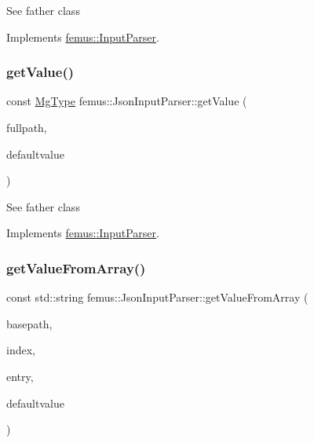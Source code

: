 See father class 

Implements \mbox{\hyperlink{classfemus_1_1_input_parser_afed8cdbe224355e291485f85dcf3a051}{femus\+::\+Input\+Parser}}.

\mbox{\label{classfemus_1_1_json_input_parser_a6851a934e4f6fa21195bbaef6f3999d9}} 
\subsubsection{\texorpdfstring{get\+Value()}{getValue()}\hspace{0.1cm}{\footnotesize\ttfamily [6/6]}}
{\footnotesize\ttfamily const \mbox{\hyperlink{_mg_type_enum_8hpp_a35aafc39068a269f658aac64338aa781}{Mg\+Type}} femus\+::\+Json\+Input\+Parser\+::get\+Value (\begin{DoxyParamCaption}\item[{const std\+::string \&}]{fullpath,  }\item[{const \mbox{\hyperlink{_mg_type_enum_8hpp_a35aafc39068a269f658aac64338aa781}{Mg\+Type}}}]{defaultvalue }\end{DoxyParamCaption})\hspace{0.3cm}{\ttfamily [virtual]}}

See father class 

Implements \mbox{\hyperlink{classfemus_1_1_input_parser_a8ce06a6bc1112d4581b6fad9e7aad858}{femus\+::\+Input\+Parser}}.

\mbox{\label{classfemus_1_1_json_input_parser_a857a85ac2a5e12c433a143762b01d1e8}} 
\subsubsection{\texorpdfstring{get\+Value\+From\+Array()}{getValueFromArray()}\hspace{0.1cm}{\footnotesize\ttfamily [1/2]}}
{\footnotesize\ttfamily const std\+::string femus\+::\+Json\+Input\+Parser\+::get\+Value\+From\+Array (\begin{DoxyParamCaption}\item[{const std\+::string \&}]{basepath,  }\item[{const unsigned int}]{index,  }\item[{const std\+::string}]{entry,  }\item[{const std\+::string}]{defaultvalue }\end{DoxyParamCaption})\hspace{0.3cm}{\ttfamily [virtual]}}

